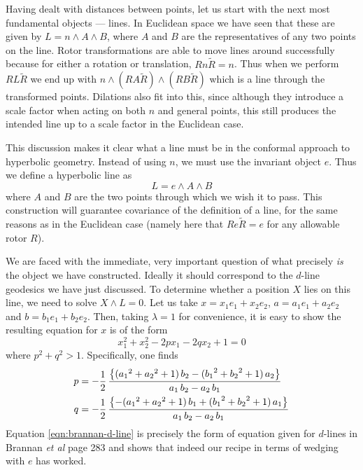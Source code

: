 Having dealt with distances between points, let us start with the
next most fundamental objects --- lines. In Euclidean space we
have seen that these are given by $L = n \wedge A \wedge B$, where $A$
and $B$ are the representatives of any two points on the line.
Rotor transformations are able to move lines around successfully
because for either a rotation or translation, $R n \tilde{R} = n$.
Thus when we perform $R L \tilde{R}$ we end up with $n \wedge (R A \tilde{R})
\wedge (R B \tilde{R})$ which is a line through the transformed points.
Dilations also fit into this, since although they introduce a
scale factor when acting on both $n$ and general points, this
still produces the intended line up to a scale factor in the
Euclidean case.

This discussion makes it clear what a line must be in the
conformal approach to hyperbolic geometry. Instead of
using $n$, we must use the invariant object $e$. Thus we
define a hyperbolic line as
%
\begin{equation}\label{eqn:line-def}
L = e \wedge A \wedge B
\end{equation}
%
where $A$ and $B$ are the two points through which we
wish it to pass. This construction will guarantee
covariance of the definition of a line, for the same
reasons as in the Euclidean case (namely here that $R e
\tilde{R} = e$ for any allowable rotor $R$).

We are faced with the immediate, very important question of
what precisely {\em is\/} the object we have constructed.
Ideally it should correspond to the $d$-line geodesics we
have just discussed. To determine whether a position $X$
lies on this line, we need to solve $X\wedge L=0$. Let us
take $x=x_1 e_1 + x_2 e_2$, $a=a_1 e_1 + a_2 e_2$ and
$b=b_1 e_1 + b_2 e_2$. Then, taking $\lambda=1$ for
convenience,  it is easy to show the resulting equation
for $x$ is of the form
%
\begin{equation}\label{eqn:brannan-d-line}
x_1^2+x_2^2-2 p x_1 -2 q x_2 +1 =0
\end{equation}
%
where $p^2+q^2>1$. Specifically, one finds
%
\begin{align}
p &= -\frac{1}{2}\,\frac {\left\{({a_1}^2+{a_2}^2
+1)\,b_2 - ({b_1}^2+{b_2}^2 +1)\,a_2\right\}}{ a_1\, b_2-
a_2\, b_1} \nn \\
%
q &= -\frac{1}{2}\,{\frac {\left\{-({a_1}^2+{a_2}^2
+1)\,b_1 + ({b_1}^2+{b_2}^2 +1)\,a_1\right\}}{{ a_1}\,{
b_2}-{ a_2}\,{ b_1}}} \nn
%
\end{align}
%
Equation \ref{eqn:brannan-d-line} is precisely the form
of equation given for $d$-lines in Brannan \emph{et al}\cite{brannan} 
page 283 and shows that
indeed our recipe in terms of wedging with $e$ has worked.

